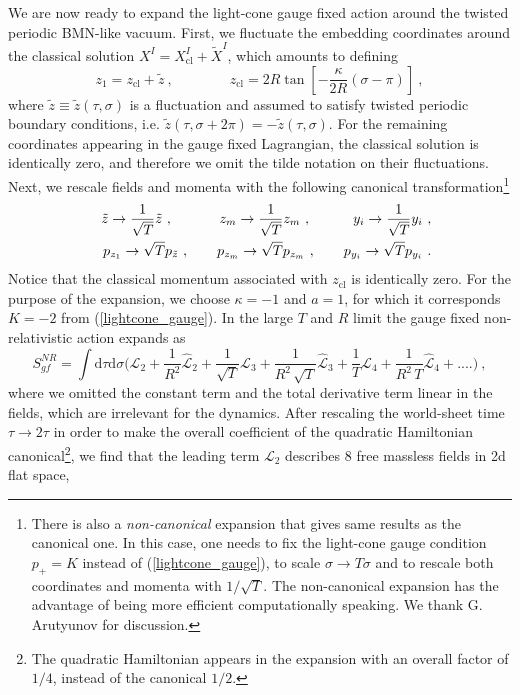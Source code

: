 \documentclass[12pt]{article}
\def\dd{\text{d}}
\def\tz{\tilde{z}}
\numberwithin{equation}{section}
\begin{document}
We are now ready to expand the light-cone gauge fixed action around the twisted periodic BMN-like vacuum. First, we fluctuate the embedding coordinates around the classical solution $X^I = X^I_{\text{cl}} + \tilde{X}^I$, which amounts to defining
\begin{equation}
\label{winding_eqn}
z_1 = z_{\text{cl}} +  \tilde{z} \ , \qquad\qquad
z_{\text{cl}} = 2R \tan \left[ -\frac{\kappa}{2 R} (\sigma-\pi) \right] \ , 
\end{equation}
where $\tilde{z} \equiv \tilde{z}(\tau, \sigma)$ is a fluctuation and assumed to satisfy twisted periodic boundary conditions, i.e. $\tilde{z}(\tau, \sigma + 2\pi) = - \tilde{z}(\tau, \sigma)$. For the remaining coordinates appearing in the gauge fixed Lagrangian, the classical solution is identically zero, and therefore we omit the tilde notation on their fluctuations.    
Next, we rescale fields and momenta with the following canonical transformation\footnote{There is also a \emph{non-canonical} expansion that gives same results as the canonical one.  In this case, one needs to fix the light-cone gauge condition $p_+ = K$ instead of (\ref{lightcone_gauge}),  to scale $\sigma\rightarrow T \sigma$ and to rescale both coordinates and momenta with $1/ \sqrt{T}$. The non-canonical expansion has the advantage of being more efficient computationally speaking.  We thank G.  Arutyunov for discussion.} 
\begin{eqnarray}
\notag
&&\tilde{z} \rightarrow \frac{1}{\sqrt{T}} \tilde{z} \ , \qquad\quad\ 
z_m \rightarrow \frac{1}{\sqrt{T}} z_m \ , \qquad\quad
y_i \rightarrow \frac{1}{\sqrt{T}} y_i \ , \\
&&p_{z_1} \rightarrow \sqrt{T} p_{\tz} \ , \qquad
p_{z_m} \rightarrow \sqrt{T} p_{z_m} \ , \qquad
p_{y_i} \rightarrow \sqrt{T} p_{y_i} \ .
\end{eqnarray}
Notice that the classical momentum associated with $z_{\text{cl}}$ is identically zero.
For the purpose of the expansion, we choose $\kappa = -1$ and $a=1$, for which it corresponds $K = -2$ from (\ref{lightcone_gauge}). 
In the large $T$ and $R$ limit the gauge fixed non-relativistic action expands as
\begin{equation}
\label{S_expan}
S^{NR}_{gf} = \int \dd \tau \dd \sigma \bigg( \mathcal{L}_2 + \frac{1}{R^2}\hat{\mathcal{L}}_2+  \frac{1}{\sqrt{T}} \mathcal{L}_3 + \frac{1}{R^2\,\sqrt{T}}\hat{\mathcal{L}}_3 + \frac{1}{T} \mathcal{L}_4 + \frac{1}{R^2\,T}\hat{\mathcal{L}}_4 + ....\bigg) \ , 
\end{equation}
where we omitted the constant term and the total derivative term linear in the fields, which are irrelevant for the dynamics. After rescaling the world-sheet time $\tau \rightarrow 2 \tau$ in order to make the overall coefficient of the quadratic Hamiltonian canonical\footnote{The quadratic Hamiltonian appears in the expansion with an overall factor of $1/4$, instead of the canonical $1/2$.}, we find that the leading term $\mathcal{L}_2$ describes 8 free massless fields in 2d flat space,
\end{document}
